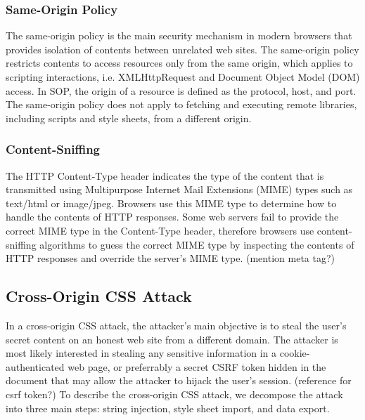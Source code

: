 \documentclass{acm_proc_article-sp}
\begin{document}
\subsubsection{Same-Origin Policy}
The same-origin policy\cite{mozillasameorigin} is the main security mechanism in modern browsers that provides isolation of contents between unrelated web sites. The same-origin policy restricts contents to access resources only from the same origin, which applies to scripting interactions, i.e. XMLHttpRequest and Document Object Model (DOM)\cite{dom} access. In SOP, the origin of a resource is defined as the protocol, host, and port. The same-origin policy does not apply to fetching and executing remote libraries, including scripts and style sheets, from a different origin.

\subsubsection{Content-Sniffing}
The HTTP Content-Type header indicates the type of the content that is transmitted using Multipurpose Internet Mail Extensions (MIME)\cite{mime} types such as text/html or image/jpeg. Browsers use this MIME type to determine how to handle the contents of HTTP responses. Some web servers fail to provide the correct MIME type in the Content-Type header, therefore browsers use content-sniffing algorithms to guess the correct MIME type by inspecting the contents of HTTP responses and override the server's MIME type.
(mention meta tag?)

\subsection{Cross-Origin CSS Attack}
In a cross-origin CSS attack, the attacker's main objective is to steal the user's secret content on an honest web site from a different domain. The attacker is most likely interested in stealing any sensitive information in a cookie-authenticated web page, or preferrably a secret CSRF token hidden in the document that may allow the attacker to hijack the user's session. 
(reference for csrf token?)
To describe the cross-origin CSS attack, we decompose the attack into three main steps: string injection, style sheet import, and data export.
\end{document}

